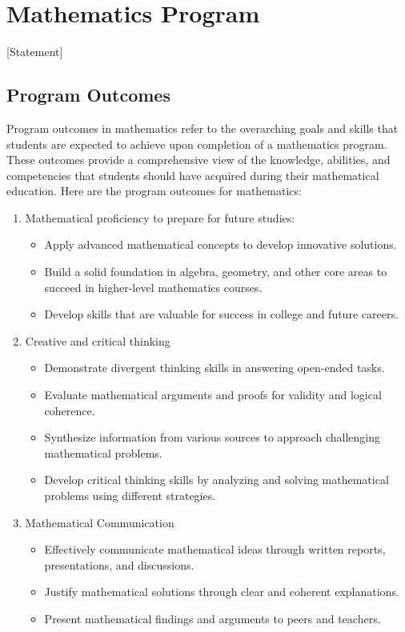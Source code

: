 \section{Mathematics Program}
[Statement]

\subsection{Program Outcomes}
Program outcomes in mathematics refer to the overarching goals and skills that students are expected to achieve upon completion of a mathematics program. These outcomes provide a comprehensive view of the knowledge, abilities, and competencies that students should have acquired during their mathematical education. Here are the program outcomes for mathematics: 
\begin{enumerate}[label=\Alph*.]
	\item{Mathematical proficiency to prepare for future studies:}
	\begin{itemize}
		\item Apply advanced mathematical concepts to develop innovative solutions.
		\item Build a solid foundation in algebra, geometry, and other core areas to succeed in higher-level mathematics courses.
		\item Develop skills that are valuable for success in college and future careers.
	\end{itemize}
	\item{Creative and critical thinking}
	\begin{itemize}
		\item Demonstrate divergent thinking skills in answering open-ended tasks. 
		\item Evaluate mathematical arguments and proofs for validity and logical coherence.
		\item Synthesize information from various sources to approach challenging mathematical problems.
		\item Develop critical thinking skills by analyzing and solving mathematical problems using different strategies.
	\end{itemize}
	\item{Mathematical Communication}
	\begin{itemize}
		\item Effectively communicate mathematical ideas through written reports, presentations, and discussions.
		\item Justify mathematical solutions through clear and coherent explanations.
		\item Present mathematical findings and arguments to peers and teachers.
	\end{itemize}
\end{enumerate}

